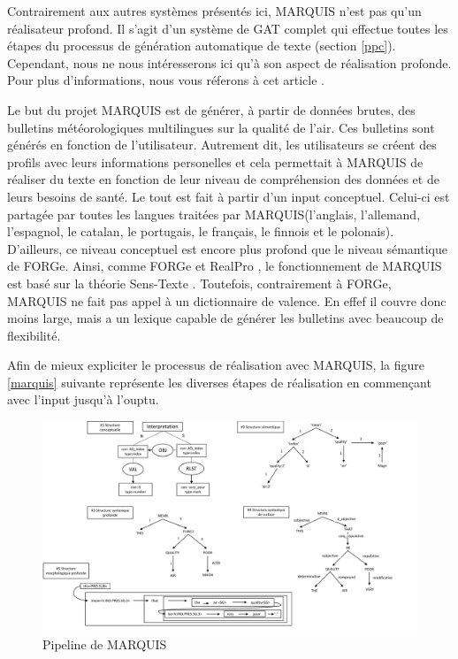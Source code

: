 Contrairement aux autres systèmes présentés ici, MARQUIS n'est pas qu'un réalisateur profond. Il s'agit d'un système de \ac{GAT} complet qui effectue toutes les étapes du processus de génération automatique de texte (section \ref{ppc}). Cependant, nous ne nous intéresserons ici qu'à son aspect de réalisation profonde. Pour plus d'informations, nous vous réferons à cet article \citep{WannerMARQUISGENERATIONUSERTAILORED2010}. 

Le but du projet MARQUIS est de générer, à partir de données brutes, des bulletins météorologiques multilingues sur la qualité de l'air. Ces bulletins sont générés en fonction de l'utilisateur. Autrement dit, les utilisateurs se créent des profils avec leurs informations personelles et cela permettait à MARQUIS de réaliser du texte en fonction de leur niveau de compréhension des données et de leurs besoins de santé. Le tout est fait à partir d'un input conceptuel. Celui-ci est partagée par toutes les langues traitées par MARQUIS(l'anglais, l'allemand, l'espagnol, le catalan, le portugais, le français, le finnois et le polonais). D'ailleurs, ce niveau conceptuel est encore plus profond que le niveau sémantique de FORGe. Ainsi, comme FORGe \citep{MilledemoFORGePompeu2017} et RealPro \citep{LavoieFastPortableRealizer1997}, le fonctionnement de MARQUIS est basé sur la théorie Sens-Texte \citep{melcuk1988}. Toutefois, contrairement à FORGe, MARQUIS ne fait pas appel à un dictionnaire de valence. En effef il couvre donc moins large, mais a un lexique capable de générer les bulletins avec beaucoup de flexibilité. 

Afin de mieux expliciter le processus de réalisation avec MARQUIS, la figure \ref{marquis} suivante représente les diverses étapes de réalisation en commençant avec l'input jusqu'à l'ouptu.

\begin{figure}[htb]
	\centering
	\includegraphics[width=1\textwidth, trim = {0cm 0cm 0cm 0cm},clip]{ch2/figs/marquis.pdf}
	\caption{Pipeline de MARQUIS}
	\label{fig:marquis}
\end{figure}

